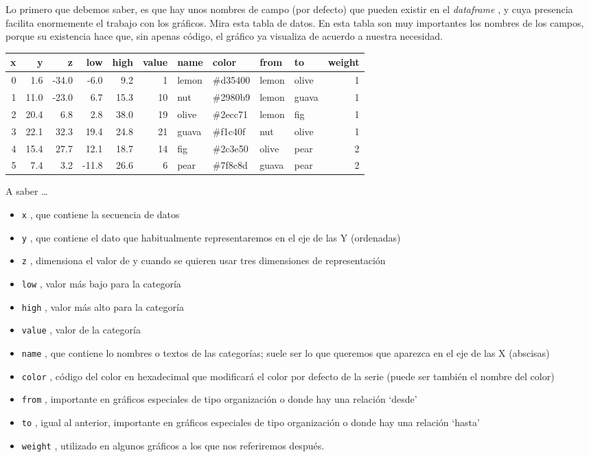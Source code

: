 \documentclass[
]{book}
\providecommand{\tightlist}{%
  \setlength{\itemsep}{0pt}\setlength{\parskip}{0pt}}
\begin{document}
Lo primero que debemos saber, es que hay unos nombres de campo (por defecto) que pueden existir en el \emph{dataframe} , y cuya presencia facilita enormemente el trabajo con los gráficos. Mira esta tabla de datos. En esta tabla son muy importantes los nombres de los campos, porque su existencia hace que, sin apenas código, el gráfico ya visualiza de acuerdo a nuestra necesidad.

\begin{table}
\centering
\begin{tabular}{r|r|r|r|r|r|l|l|l|l|r}
\hline
x & y & z & low & high & value & name & color & from & to & weight\\
\hline
0 & 1.6 & -34.0 & -6.0 & 9.2 & 1 & lemon & \#d35400 & lemon & olive & 1\\
\hline
1 & 11.0 & -23.0 & 6.7 & 15.3 & 10 & nut & \#2980b9 & lemon & guava & 1\\
\hline
2 & 20.4 & 6.8 & 2.8 & 38.0 & 19 & olive & \#2ecc71 & lemon & fig & 1\\
\hline
3 & 22.1 & 32.3 & 19.4 & 24.8 & 21 & guava & \#f1c40f & nut & olive & 1\\
\hline
4 & 15.4 & 27.7 & 12.1 & 18.7 & 14 & fig & \#2c3e50 & olive & pear & 2\\
\hline
5 & 7.4 & 3.2 & -11.8 & 26.6 & 6 & pear & \#7f8c8d & guava & pear & 2\\
\hline
\end{tabular}
\end{table}

A saber \ldots{}

\begin{itemize}
\tightlist
\item
  \texttt{x} , que contiene la secuencia de datos
\item
  \texttt{y} , que contiene el dato que habitualmente representaremos en el eje de las Y (ordenadas)
\item
  \texttt{z} , dimensiona el valor de y cuando se quieren usar tres dimensiones de representación
\item
  \texttt{low} , valor más bajo para la categoría
\item
  \texttt{high} , valor más alto para la categoría
\item
  \texttt{value} , valor de la categoría
\item
  \texttt{name} , que contiene lo nombres o textos de las categorías; suele ser lo que queremos que aparezca en el eje de las X (abscisas)
\item
  \texttt{color} , código del color en hexadecimal que modificará el color por defecto de la serie (puede ser también el nombre del color)
\item
  \texttt{from} , importante en gráficos especiales de tipo organización o donde hay una relación `desde'
\item
  \texttt{to} , igual al anterior, importante en gráficos especiales de tipo organización o donde hay una relación `hasta'
\item
  \texttt{weight} , utilizado en algunos gráficos a los que nos referiremos después.
\end{itemize}
\end{document}
